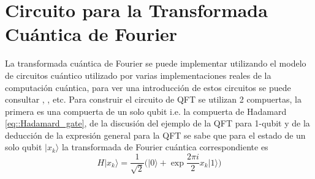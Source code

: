 \documentclass[a4paper]{article}
\begin{document}
\section{Circuito para la Transformada Cuántica de Fourier}
La transformada cuántica de Fourier se puede implementar utilizando el modelo de circuitos cuántico utilizado por varias implementaciones reales de la computación cuántica, para ver una introducción de estos circuitos  se puede consultar \cite{Qiskit}, \cite{Medina}, \cite{Nielsen} etc. Para construir el circuito de QFT se utilizan 2 compuertas, la primera es una compuerta de un solo qubit i.e. la compuerta de Hadamard \ref{eq::Hadamard_gate}, de la discusión del ejemplo de la QFT para 1-qubit y de la deducción de la expresión general para la QFT se sabe que para el estado de un solo qubit $\vert x_k\rangle$ la transformada de Fourier cuántica correspondiente es 
\begin{equation}
H\vert x_k\rangle=\frac{1}{\sqrt{2}}\bigg(\vert 0\rangle + \exp{\frac{2\pi i}{2} x_k}\vert 1\rangle\bigg)
\end{equation}
\end{document}
